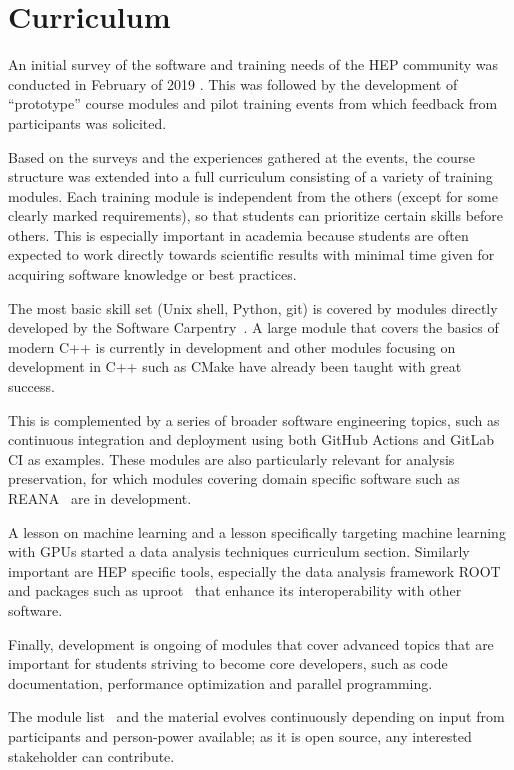 \documentclass[twocolumn]{svjour3}          %
\begin{document}
\section{Curriculum}\label{sec:Curriculum}

An initial survey of the software and training needs of the HEP community was conducted in February of 2019 \cite{david_lange}. This was followed by the development of \enquote{prototype} course modules and  pilot training events from which feedback from participants was solicited.

Based on the surveys and the experiences gathered at the events, the course structure was extended into a full curriculum consisting of a variety of training modules.
Each training module is independent from the others (except for some clearly marked requirements), so that students can prioritize certain skills before others. This is especially important in academia because students are often expected to work directly towards scientific results with minimal time given for acquiring software knowledge or best practices.

The most basic skill set (Unix shell, Python, git) is covered by modules directly developed by the Software Carpentry~\cite{softcarp}. A large module that covers the basics of modern C++ is currently in development and other modules focusing on development in C++ such as CMake have already been taught with great success.

This is complemented by a series of broader software engineering topics, such as continuous integration and deployment using both GitHub Actions and GitLab CI as examples. These modules are also particularly relevant for analysis preservation, for which modules covering domain specific software such as REANA~\cite{reana} are in development.

A lesson on machine learning and a lesson specifically targeting machine learning with GPUs started a data analysis techniques curriculum section. Similarly important are HEP specific tools, especially the data analysis framework ROOT~\cite{root_cern} and packages such as uproot~\cite{uproot} that enhance its interoperability with other software.

Finally, development is ongoing of modules that cover advanced topics that are important for students striving to become core developers, such as code documentation, performance optimization and parallel programming.

The module list~\cite{HSF-curriculum} and the material evolves continuously depending on input from participants and person-power available; as it is open source, any interested stakeholder can contribute.
\end{document}

